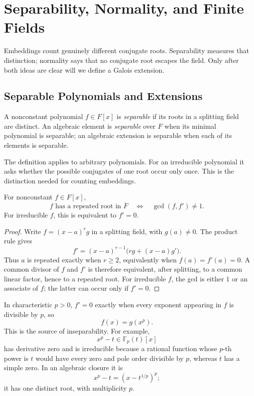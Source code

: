 \chapter[Separability, Normality, and Finite Fields]{Separability, Normality, and Finite Fields}

Embeddings count genuinely different conjugate roots.  Separability measures
that distinction; normality says that no conjugate root escapes the field.
Only after both ideas are clear will we define a Galois extension.

\section{Separable Polynomials and Extensions}
\begin{definition}
A nonconstant polynomial \(f\in F[x]\) is \emph{separable} if its roots in a
splitting field are distinct.  An algebraic element is \emph{separable} over
\(F\) when its minimal polynomial is separable; an algebraic extension is
separable when each of its elements is separable.
\end{definition}

The definition applies to arbitrary polynomials.  For an irreducible
polynomial it asks whether the possible conjugates of one root occur only
once.  This is the distinction needed for counting embeddings.

\begin{proposition}\label{prop:separable-criterion}
For nonconstant \(f\in F[x]\),
\[
f\text{ has a repeated root in }\overline F
\quad\Longleftrightarrow\quad
\gcd(f,f')\ne1.
\]
For irreducible \(f\), this is equivalent to \(f'=0\).
\end{proposition}
\begin{proof}
Write \(f=(x-a)^rg\) in a splitting field, with \(g(a)\ne0\).  The product
rule gives
\[
f'=(x-a)^{r-1}\bigl(rg+(x-a)g'\bigr).
\]
Thus \(a\) is repeated exactly when \(r\ge2\), equivalently when
\(f(a)=f'(a)=0\).  A common divisor of \(f\) and \(f'\) is therefore
equivalent, after splitting, to a common linear factor, hence to a repeated
root.  For irreducible \(f\), the gcd is either \(1\) or an associate of
\(f\); the latter can occur only if \(f'=0\).
\end{proof}

\begin{remark}
In characteristic \(p>0\), \(f'=0\) exactly when every exponent appearing
in \(f\) is divisible by \(p\), so
\[
f(x)=g(x^p).
\]
This is the source of inseparability.  For example,
\[
x^p-t\in\mathbb F_p(t)[x]
\]
has derivative zero and is irreducible because a rational function whose
\(p\)-th power is \(t\) would have every zero and pole order divisible by
\(p\), whereas \(t\) has a simple zero.  In an algebraic closure it is
\[
x^p-t=(x-t^{1/p})^p;
\]
it has one distinct root, with multiplicity \(p\).
\end{remark}

